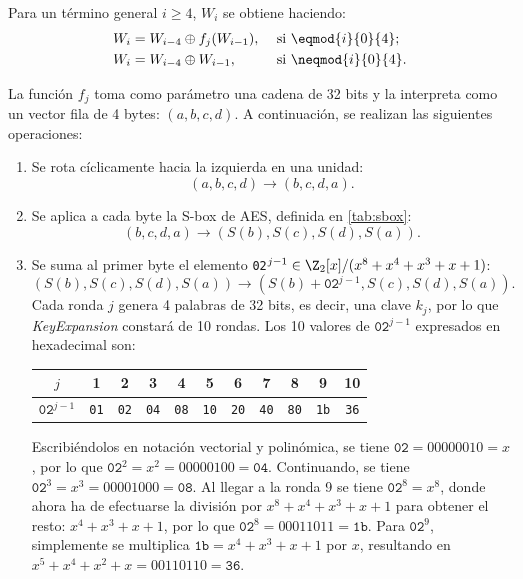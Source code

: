 Para un término general $i \geq4$, $W_i$ se obtiene haciendo:
\begin{align*}
    &&W_i &= W_{i-4}  \oplus f_j(W_{i-1}), &&\text{ si } \eqmod{i}{0}{4};&&\\
    &&W_i &= W_{i-4}  \oplus W_{i-1}, &&\text{ si } \neqmod{i}{0}{4}.&&
\end{align*}

La función $f_j$ toma como parámetro una cadena de 32 bits y la interpreta como un vector fila de 4 bytes: $(a,b,c,d)$. A continuación, se realizan las siguientes operaciones:

\begin{enumerate}[itemsep=-5pt]
    \item Se rota cíclicamente hacia la izquierda en una unidad: 
    \[(a,b,c,d) \to (b,c,d, a).\]
    \item Se aplica a cada byte la S-box de AES, definida en \ref{tab:sbox}:
    \[(b,c,d, a) \to (S(b),S(c),S(d),S(a)).\]
    \item Se suma al primer byte el elemento \texttt{02}$^{j-1}\in \Z_2[x]/(x^8 + x^4 + x^3 + x + 1)$:
    \[(S(b),S(c),S(d),S(a)) \to (S(b) + \texttt{02}^{j-1},S(c),S(d),S(a)).\]
Cada ronda $j$ genera 4 palabras de 32 bits, es decir, una clave $k_j$, por lo que \textit{KeyExpansion} constará de 10 rondas. Los 10 valores de $\texttt{02}^{j-1}$ expresados en hexadecimal son:

\begin{table}[h]
    \centering
    \begin{tabular}{|c|cccccccccc|}
        \hline
        $j$ & 1 & 2 & 3 & 4 & 5 & 6 & 7 & 8 & 9 & 10 \\
        \hline
        $\texttt{02}^{j-1}$ & \texttt{01} & \texttt{02} & \texttt{04} & \texttt{08} & \texttt{10} & \texttt{20} & \texttt{40} & \texttt{80} & \texttt{1b} & \texttt{36} \\
        \hline
    \end{tabular}
\end{table}
\vspace{-0.2em}

    Escribiéndolos en notación vectorial y polinómica, se tiene $\texttt{02} = 00000010 = x$, por lo que $\texttt{02}^2 = x^2 = 00000100= \texttt{04}$. Continuando, se tiene $\texttt{02}^3 = x^3 = 00001000= \texttt{08}$. Al llegar a la ronda 9 se tiene $\texttt{02}^8 = x^8$, donde ahora ha de efectuarse la división por $x^8 + x^4 + x^3 + x + 1$ para obtener el resto: $x^4 + x^3 + x + 1$, por lo que $\texttt{02}^8 = 00011011 = \texttt{1b}$. Para $\texttt{02}^9$, simplemente se multiplica $\texttt{1b} = x^4 + x^3 + x + 1$ por $x$, resultando en $x^5 + x^4 + x^2 + x = 00110110 = \texttt{36}$.


\end{enumerate}

